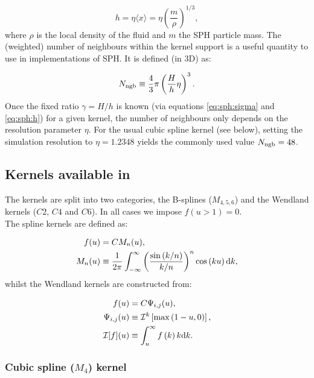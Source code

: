 \begin{equation}
  h = \eta \langle x \rangle = \eta \left(\frac{m}{\rho}\right)^{1/3},
\end{equation}
where $\rho$ is the local density of the fluid and $m$ the SPH
particle mass. 
The (weighted) number of neighbours within the kernel support is a
useful quantity to use in implementations of SPH. It is defined (in
3D) as:

\begin{equation}
  N_{\rm ngb} \equiv \frac{4}{3}\pi \left(\frac{H}{h}\eta\right)^3.
\end{equation}
Once the fixed ratio $\gamma= H/h$ is known (via equations
\ref{eq:sph:sigma} and \ref{eq:sph:h}) for a given kernel, the number
of neighbours only depends on the resolution parameter $\eta$.  For
the usual cubic spline kernel (see below), setting the simulation
resolution to $\eta=1.2348$ yields the commonly used value $N_{\rm
  ngb} = 48$.

\subsection{Kernels available in \swift}

The \swift kernels are split into two categories, the B-splines
($M_{4,5,6}$) and the Wendland kernels ($C2$, $C4$ and $C6$). In all
cases we impose $f(u>1) = 0$.\\
The spline kernels are defined as:

\begin{align}
  f(u) &= C M_n(u), \nonumber\\
  M_n(u) &\equiv \frac{1}{2\pi}
  \int_{-\infty}^{\infty}
  \left(\frac{\sin\left(k/n\right)}{k/n}\right)^n\cos\left(ku\right){\rm
  d}k \nonumber,
\end{align}
whilst the Wendland kernels are constructed from:

\begin{align}
  f(u) &= C \Psi_{i,j}(u), \nonumber\\
  \Psi_{i,j}(u) &\equiv
  \mathcal{I}^k\left[\max\left(1-u,0\right)\right], \nonumber\\
  \mathcal{I}[f](u) &\equiv \int_u^\infty f\left(k\right)k{\rm d}k. \nonumber
\end{align}

\subsubsection{Cubic spline ($M_4$) kernel}

